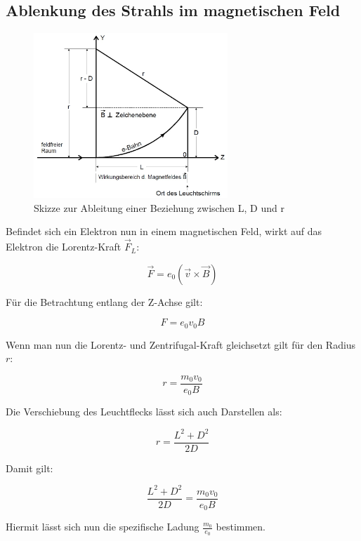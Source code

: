 \subsection{Ablenkung des Strahls im magnetischen Feld}
\begin{figure}[h]
  \centering
  \includegraphics[width=0.65\textwidth]{Grafiken/V501(2)_Abb2.jpg}
  \caption{Skizze zur Ableitung einer Beziehung zwischen L, D und r}
\end{figure}
Befindet sich ein Elektron nun in einem magnetischen Feld, wirkt auf das Elektron die Lorentz-Kraft $\vec{F}_L$:

\begin{equation}
  \vec{F} = e_0 (\vec{v} \times \vec{B})
\end{equation}

Für die Betrachtung entlang der Z-Achse gilt:

\begin{equation}
  F = e_0 v_0 B
\end{equation}

Wenn man nun die Lorentz- und Zentrifugal-Kraft gleichsetzt gilt für den Radius $r$:

\begin{equation}
  r = \frac{m_0v_0}{e_0B}
\end{equation}

Die Verschiebung des Leuchtflecks lässt sich auch Darstellen als:

\begin{equation}
  r = \frac{L^2 + D^2}{2D}
\end{equation}

Damit gilt:

\begin{equation}
\label{eq:Theorie_Qspez}
  \frac{L^2 + D^2}{2D} = \frac{m_0v_0}{e_0B}
\end{equation}

Hiermit lässt sich nun die spezifische Ladung $\frac{m_0}{e_0}$ bestimmen.
